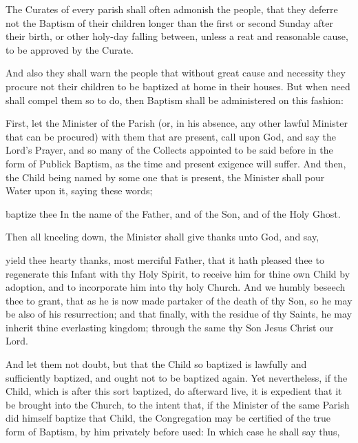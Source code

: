 
\begin{rubric}
The Curates of every parish shall often admonish the people, that they deferre not the Baptism of their children longer than the first or second Sunday after their birth, or other holy-day falling between, unless a reat and reasonable cause, to be approved by the Curate.
\end{rubric}

\begin{rubric}
And also they shall warn the people that without great cause and necessity they procure not their children to be baptized at home in their houses.
But when need shall compel them so to do, then Baptism shall be administered on this fashion:
\end{rubric}

\begin{rubric}
First, let the Minister of the Parish (or, in his absence, any other lawful Minister that can be procured) with them that are present, call upon God, and say the Lord's Prayer, and so many of the Collects appointed to be said before in the form of Publick Baptism, as the time and present exigence will suffer.
And then, the Child being named by some one that is present, the Minister shall pour Water upon it, saying these words;
\end{rubric}

 baptize thee In the name of the Father, and of the Son, and of the Holy Ghost.

\begin{rubric}
Then all kneeling down, the Minister shall give thanks unto God, and say,
\end{rubric}

 yield thee hearty thanks, most merciful Father, that it hath pleased thee to regenerate this Infant with thy Holy Spirit, to receive him for thine own Child by adoption, and to incorporate him into thy holy Church.
And we humbly beseech thee to grant, that as he is now made partaker of the death of thy Son, so he may be also of his resurrection; and that finally, with the residue of thy Saints, he may inherit thine everlasting kingdom; through the same thy Son Jesus Christ our Lord.

\begin{rubric}
And let them not doubt, but that the Child so baptized is lawfully and sufficiently baptized, and ought not to be baptized again.
Yet nevertheless, if the Child, which is after this sort baptized, do afterward live, it is expedient that it be brought into the Church, to the intent that, if the Minister of the same Parish did himself baptize that Child, the Congregation may be certified of the true form of Baptism, by him privately before used: In which case he shall say thus,
\end{rubric}

